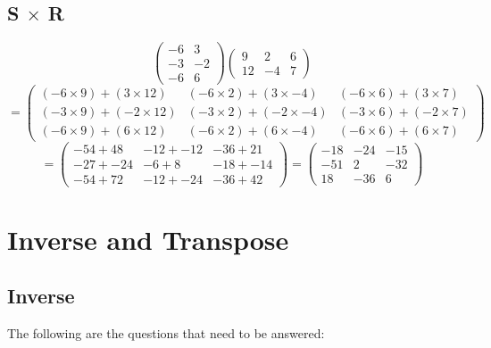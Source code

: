 \documentclass[a4paper,12pt]{article}
\begin{document}
      \subsection{S $\times$ R}
        \begin{equation}
          \begin{pmatrix}
            -6 & 3\\
            -3 & -2\\
            -6 & 6
          \end{pmatrix}
          \begin{pmatrix}
            9 & 2 & 6\\
            12 & -4 & 7
          \end{pmatrix}
        \end{equation}
        \begin{equation}
          =
          \begin{pmatrix}
            (-6 \times 9) + ( 3 \times 12) & (-6 \times 2) + ( 3 \times -4) & (-6 \times 6) + ( 3 \times 7)\\
            (-3 \times 9) + (-2 \times 12) & (-3 \times 2) + (-2 \times -4) & (-3 \times 6) + (-2 \times 7)\\
            (-6 \times 9) + ( 6 \times 12) & (-6 \times 2) + ( 6 \times -4) & (-6 \times 6) + ( 6 \times 7)
          \end{pmatrix}
        \end{equation}
        \begin{equation}
          =
          \begin{pmatrix}
            -54 +  48 & -12 + -12 & -36 +  21\\
            -27 + -24 & -6  +   8 & -18 + -14\\
            -54 +  72 & -12 + -24 & -36 +  42
          \end{pmatrix}
          =
          \begin{pmatrix}
            -18 & -24 & -15\\
            -51 &   2 & -32\\
             18 & -36 &   6
          \end{pmatrix}
        \end{equation}

    \newpage

    \section{Inverse and Transpose}
      \subsection{Inverse}
        The following are the questions that need to be answered:
\end{document}
